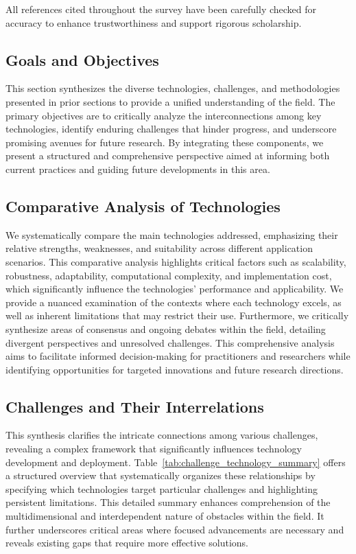 \documentclass[sigconf]{acmart}
\begin{document}
All references cited throughout the survey have been carefully checked for accuracy to enhance trustworthiness and support rigorous scholarship.

\subsection{Goals and Objectives}
This section synthesizes the diverse technologies, challenges, and methodologies presented in prior sections to provide a unified understanding of the field. The primary objectives are to critically analyze the interconnections among key technologies, identify enduring challenges that hinder progress, and underscore promising avenues for future research. By integrating these components, we present a structured and comprehensive perspective aimed at informing both current practices and guiding future developments in this area.

\subsection{Comparative Analysis of Technologies}
We systematically compare the main technologies addressed, emphasizing their relative strengths, weaknesses, and suitability across different application scenarios. This comparative analysis highlights critical factors such as scalability, robustness, adaptability, computational complexity, and implementation cost, which significantly influence the technologies' performance and applicability. We provide a nuanced examination of the contexts where each technology excels, as well as inherent limitations that may restrict their use. Furthermore, we critically synthesize areas of consensus and ongoing debates within the field, detailing divergent perspectives and unresolved challenges. This comprehensive analysis aims to facilitate informed decision-making for practitioners and researchers while identifying opportunities for targeted innovations and future research directions.

\subsection{Challenges and Their Interrelations}
This synthesis clarifies the intricate connections among various challenges, revealing a complex framework that significantly influences technology development and deployment. Table~\ref{tab:challenge_technology_summary} offers a structured overview that systematically organizes these relationships by specifying which technologies target particular challenges and highlighting persistent limitations. This detailed summary enhances comprehension of the multidimensional and interdependent nature of obstacles within the field. It further underscores critical areas where focused advancements are necessary and reveals existing gaps that require more effective solutions.
\end{document}
